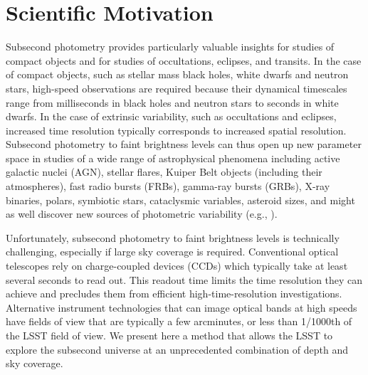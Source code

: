 \documentclass[12pt, letterpaper]{article}
\begin{document}
\clearpage

\section{Scientific Motivation}


Subsecond photometry provides particularly valuable insights for studies of compact 
objects and for studies of occultations, eclipses, and transits. In the case of compact objects, such as stellar mass black holes, white dwarfs and neutron stars, high-speed observations are required because their dynamical timescales range from milliseconds in black holes and neutron stars to seconds in white dwarfs. In the case of extrinsic variability, such as occultations and eclipses, increased time resolution typically corresponds to increased spatial resolution. Subsecond photometry to faint brightness levels can thus open up new parameter space in studies of a wide range of astrophysical phenomena including active galactic nuclei (AGN), stellar flares, Kuiper Belt objects (including their atmospheres), fast radio bursts (FRBs), gamma-ray bursts (GRBs), X-ray binaries, polars, symbiotic stars, cataclysmic variables, asteroid sizes, and might as well discover new sources of photometric variability (e.g., \citealt{D2011, KRS2014, Gandhi2016}). 

Unfortunately, subsecond photometry to faint brightness levels is technically challenging, especially if large sky coverage is required. Conventional optical telescopes rely on charge-coupled devices (CCDs) which typically take at least several seconds to read out. This readout time limits the time resolution they can achieve and precludes them from efficient high-time-resolution investigations. Alternative instrument technologies that can image optical bands at high speeds have fields of view that are typically a few arcminutes, or less than 1/1000th of the LSST field of view. We present here a method that allows the LSST to explore the subsecond universe at an unprecedented combination of 
depth and sky coverage. 
\end{document}

